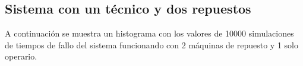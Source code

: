 \documentclass[10pt,a4paper]{article} %
\begin{document}
                                                                                                                                                                                                                                                                                                                                                                                                                        \subsection{Sistema con un t\'ecnico y dos repuestos}
                                                                                                                                                                                                                                                                                                                                                                                                                            A continuaci\'on se muestra un histograma con los valores de 10000 simulaciones de
                                                                                                                                                                                                                                                                                                                                                                                                                            tiempos de fallo del sistema funcionando con 2 m\'aquinas de repuesto y 1 solo operario.
\end{document}
